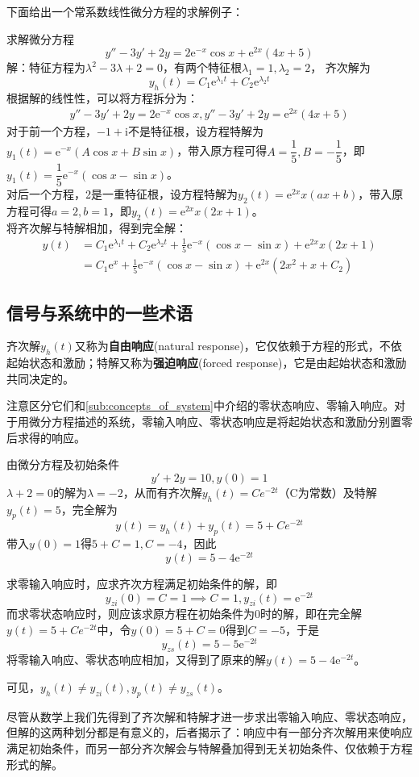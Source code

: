 \documentclass{ctexbook}
\begin{document}
下面给出一个常系数线性微分方程的求解例子：
\begin{example}
    求解微分方程\[y''-3y'+2y=2\mathrm{e}^{-x}\cos x+\mathrm{e}^{2x}(4x+5)\]
解：特征方程为$\lambda^2-3\lambda+2=0$，有两个特征根$\lambda_1=1,\lambda_2=2$，
齐次解为$$y_h(t)=C_1\mathrm{e}^{\lambda_1 t}+C_2\mathrm{e}^{\lambda_2 t}$$
根据解的线性性，可以将方程拆分为：\begin{align*}
    y''-3y'+2y=2\mathrm{e}^{-x}\cos x,y''-3y'+2y=\mathrm{e}^{2x}(4x+5)
\end{align*}
对于前一个方程，$-1+\mathrm{i}$不是特征根，设方程特解为$y_1(t)=\mathrm{e}^{-x}(A\cos x+B\sin x)$，带入原方程可得$A=\dfrac{1}{5},B=-\dfrac{1}{5}$，即$y_1(t)=\dfrac{1}{5}\mathrm{e}^{-x}(\cos x-\sin x)$。\\
对后一个方程，2是一重特征根，设方程特解为$y_2(t)=\mathrm{e}^{2x}x(ax+b)$，带入原方程可得$a=2,b=1$，即$y_2(t)=\mathrm{e}^{2x}x(2x+1)$。\\
将齐次解与特解相加，得到完全解：\begin{align*}
    y(t)&=C_1\mathrm{e}^{\lambda_1 t}+C_2\mathrm{e}^{\lambda_2 t}+\frac{1}{5}\mathrm{e}^{-x}(\cos x-\sin x)+\mathrm{e}^{2x}x(2x+1)\\
    &=C_1 \mathrm{e}^{x}+\frac{1}{5}\mathrm{e}^{-x}(\cos x-\sin x)+\mathrm{e}^{2x}(2x^2+x+C_2)
\end{align*}
\end{example}

\subsection{信号与系统中的一些术语}\label{sub:term_in_ODE}

\begin{definition}[自由响应与强迫相应]
    齐次解$y_h(t)$又称为\textbf{自由响应}(natural response)，它仅依赖于方程的形式，不依起始状态和激励；特解又称为\textbf{强迫响应}(forced response)，它是由起始状态和激励共同决定的。
\end{definition}
注意区分它们和\ref{sub:concepts_of_system}中介绍的零状态响应、零输入响应。对于用微分方程描述的系统，零输入响应、零状态响应是将起始状态和激励分别置零后求得的响应。

\begin{example}[两种响应划分方式的区别]
    由微分方程及初始条件
    \[y'+2y=10,y(0)=1\]
    $\lambda+2=0$的解为$\lambda=-2$，从而有齐次解$y_h(t)=Ce^{-2t}$（C为常数）及特解$y_p(t)=5$，完全解为
    $$y(t)=y_h(t)+y_p(t)=5+Ce^{-2t}$$
    带入$y(0)=1$得$5+C=1,C=-4$，因此
    \[y(t)=5-4\mathrm{e}^{-2t}\]

    求零输入响应时，应求齐次方程满足初始条件的解，即
    $$y_{zi}(0)=C=1\implies C=1,y_{zi}(t)=\mathrm{e}^{-2t}$$
    而求零状态响应时，则应该求原方程在初始条件为0时的解，即在完全解$y(t)=5+Ce^{-2t}$中，令$y(0)=5+C=0$得到$C=-5$，于是
    $$y_{zs}(t)=5-5\mathrm{e}^{-2t}$$
    将零输入响应、零状态响应相加，又得到了原来的解$y(t)=5-4\mathrm{e}^{-2t}$。

    可见，$y_h(t)\neq y_{zi}(t),y_p(t)\neq y_{zs}(t)$。
\end{example}
尽管从数学上我们先得到了齐次解和特解才进一步求出零输入响应、零状态响应，但解的这两种划分都是有意义的，后者揭示了：响应中有一部分齐次解用来使响应满足初始条件，而另一部分齐次解会与特解叠加得到无关初始条件、仅依赖于方程形式的解。
\end{document}
